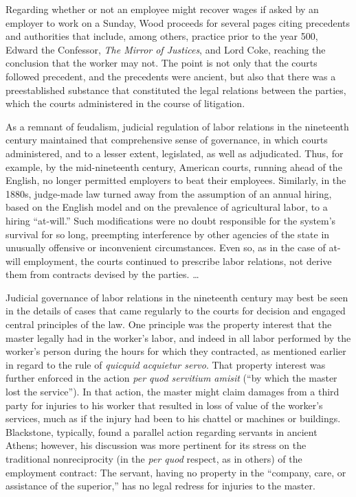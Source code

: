 \documentclass[
  letterpaper,
  11pt,
  DIV=9,
  openright]{scrbook}
\begin{document}
Regarding whether or not an employee might recover wages if asked by an
employer to work on a Sunday, Wood proceeds for several pages citing
precedents and authorities that include, among others, practice prior to
the year 500, Edward the Confessor, \emph{The Mirror of Justices}, and
Lord Coke, reaching the conclusion that the worker may not. The point is
not only that the courts followed precedent, and the precedents were
ancient, but also that there was a preestablished substance that
constituted the legal relations between the parties, which the courts
administered in the course of litigation.

As a remnant of feudalism, judicial regulation of labor relations in the
nineteenth century maintained that comprehensive sense of governance, in
which courts administered, and to a lesser extent, legislated, as well
as adjudicated. Thus, for example, by the mid-nineteenth century,
American courts, running ahead of the English, no longer permitted
employers to beat their employees. Similarly, in the 1880s, judge-made
law turned away from the assumption of an annual hiring, based on the
English model and on the prevalence of agricultural labor, to a hiring
``at-will.'' Such modifications were no doubt responsible for the
system's survival for so long, preempting interference by other agencies
of the state in unusually offensive or inconvenient circumstances. Even
so, as in the case of at-will employment, the courts continued to
prescribe labor relations, not derive them from contracts devised by the
parties. \ldots{}

Judicial governance of labor relations in the nineteenth century may
best be seen in the details of cases that came regularly to the courts
for decision and engaged central principles of the law. One principle
was the property interest that the master legally had in the worker's
labor, and indeed in all labor performed by the worker's person during
the hours for which they contracted, as mentioned earlier in regard to
the rule of \emph{quicquid acquietur servo}. That property interest was
further enforced in the action \emph{per quod servitium amisit} (``by
which the master lost the service''). In that action, the master might
claim damages from a third party for injuries to his worker that
resulted in loss of value of the worker's services, much as if the
injury had been to his chattel or machines or buildings. Blackstone,
typically, found a parallel action regarding servants in ancient Athens;
however, his discussion was more pertinent for its stress on the
traditional nonreciprocity (in the \emph{per quod} respect, as in
others) of the employment contract: The servant, having no property in
the ``company, care, or assistance of the superior,'' has no legal
redress for injuries to the master.
\end{document}
